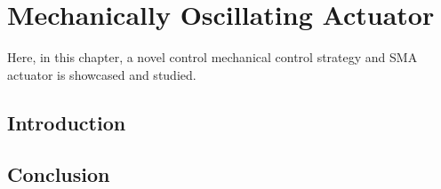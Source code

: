 
\chapter{Mechanically Oscillating Actuator}
Here, in this chapter, a novel control mechanical control strategy and SMA actuator is showcased and studied.
\section{Introduction}
\section{Conclusion}

